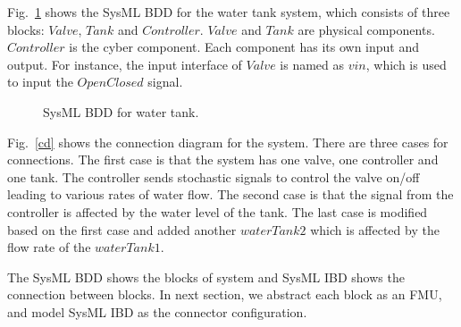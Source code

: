 Fig.~\ref{myad} shows the SysML BDD for the water tank system, which consists of three blocks: $Valve$, $Tank$ and $Controller$. $Valve$ and $Tank$ are physical components. $Controller$ is the cyber component. Each component has its own input and output. For instance, the input interface of $Valve$ is named as $vin$, which is used to input the $OpenClosed$ signal. 
\begin{figure}[htbp]
	\caption{SysML BDD for water tank.}
	\label{myad}
\end{figure}

Fig.~\ref{cd} shows the connection diagram for the system. There are three cases for connections. The first case is that the system has one valve, one controller and one tank. The controller sends stochastic signals to control the valve on/off leading to various rates of water flow. The second case is that the signal from the controller is affected by the water level of the tank. The last case is modified based on the first case and added another $waterTank2$ which is affected by the flow rate of the $waterTank1$.

\begin{figure}[htbp]
\end{figure}
The SysML BDD shows the blocks of system and SysML IBD shows the connection between blocks. In next section, we abstract each block as an FMU, and model SysML IBD as the connector configuration.

